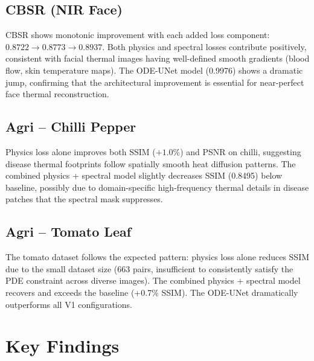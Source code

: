 \subsection{CBSR (NIR Face)}

CBSR shows monotonic improvement with each added loss component: $0.8722 \to 0.8773 \to 0.8937$. Both physics and spectral losses contribute positively, consistent with facial thermal images having well-defined smooth gradients (blood flow, skin temperature maps). The ODE-UNet model (0.9976) shows a dramatic jump, confirming that the architectural improvement is essential for near-perfect face thermal reconstruction.

\subsection{Agri -- Chilli Pepper}

Physics loss alone improves both SSIM ($+1.0\%$) and PSNR on chilli, suggesting disease thermal footprints follow spatially smooth heat diffusion patterns. The combined physics + spectral model slightly decreases SSIM (0.8495) below baseline, possibly due to domain-specific high-frequency thermal details in disease patches that the spectral mask suppresses.

\subsection{Agri -- Tomato Leaf}

The tomato dataset follows the expected pattern: physics loss alone reduces SSIM due to the small dataset size (663 pairs, insufficient to consistently satisfy the PDE constraint across diverse images). The combined physics + spectral model recovers and exceeds the baseline (+0.7\% SSIM). The ODE-UNet dramatically outperforms all V1 configurations.

\section{Key Findings}

